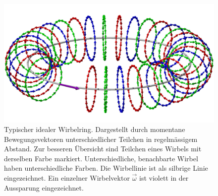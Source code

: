 \begin{figure}
\centering
\includegraphics[width=1\textwidth]{papers/wirbelringe/fig/wirbelring_RGB.jpg}
\caption{Typischer idealer Wirbelring.
Dargestellt durch momentane Bewegungsvektoren unterschiedlicher Teilchen in regelmässigem Abstand.
Zur besseren Übersicht sind Teilchen eines Wirbels mit derselben Farbe markiert.
Unterschiedliche, benachbarte Wirbel haben unterschiedliche Farben.
Die Wirbellinie ist als silbrige Linie eingezeichnet.
Ein einzelner Wirbelvektor \(\vec{\omega}\) ist violett in der Aussparung eingezeichnet.\label{Wirbelringe:fig:generell}}
\end{figure}